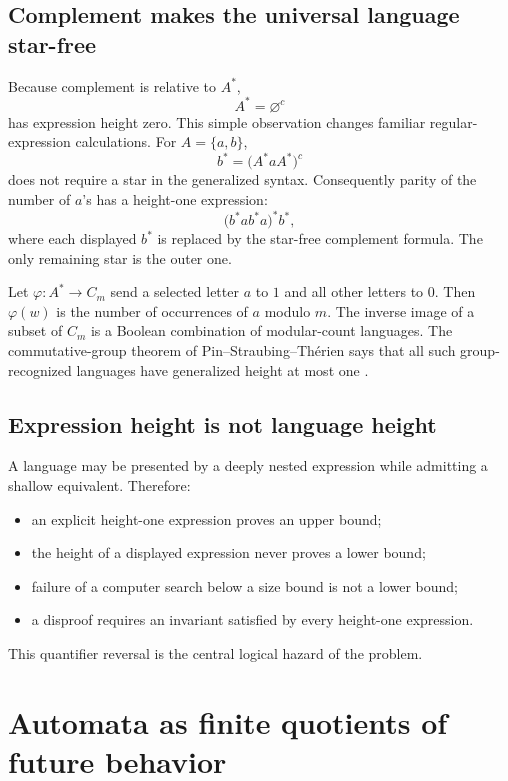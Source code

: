 \documentclass{amsart}
\begin{document}
\subsection{Complement makes the universal language star-free}

Because complement is relative to $A^\ast$,
\[
  A^\ast=\varnothing^c
\]
has expression height zero.  This simple observation changes familiar regular-expression calculations.  For $A=\{a,b\}$,
\[
  b^\ast=\bigl(A^\ast a A^\ast\bigr)^c
\]
does not require a star in the generalized syntax.  Consequently parity of the number of $a$'s has a height-one expression:
\[
  \bigl(b^\ast a b^\ast a\bigr)^\ast b^\ast,
\]
where each displayed $b^\ast$ is replaced by the star-free complement formula.  The only remaining star is the outer one.

\begin{example}
Let $\varphi:A^\ast\to C_m$ send a selected letter $a$ to $1$ and all other letters to $0$.  Then $\varphi(w)$ is the number of occurrences of $a$ modulo $m$.  The inverse image of a subset of $C_m$ is a Boolean combination of modular-count languages.  The commutative-group theorem of Pin--Straubing--Th\'erien says that all such group-recognized languages have generalized height at most one \cite{pinStraubingTherien1992}.
\end{example}

\subsection{Expression height is not language height}

A language may be presented by a deeply nested expression while admitting a shallow equivalent.  Therefore:
\begin{itemize}
  \item an explicit height-one expression proves an upper bound;
  \item the height of a displayed expression never proves a lower bound;
  \item failure of a computer search below a size bound is not a lower bound;
  \item a disproof requires an invariant satisfied by every height-one expression.
\end{itemize}
This quantifier reversal is the central logical hazard of the problem.

\section{Automata as finite quotients of future behavior}
\end{document}

